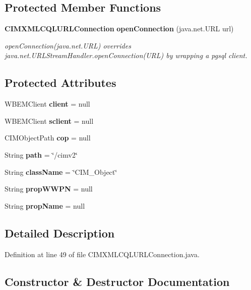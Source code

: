 \subsection*{Protected Member Functions}
\begin{DoxyCompactItemize}
\item 
{\bf C\+I\+M\+X\+M\+L\+C\+Q\+L\+U\+R\+L\+Connection} {\bf open\+Connection} (java.\+net.\+U\+R\+L url)
\begin{DoxyCompactList}\small\item\em open\+Connection(java.\+net.\+U\+R\+L) overrides java.\+net.\+U\+R\+L\+Stream\+Handler.\+open\+Connection(\+U\+R\+L) by wrapping a pgsql client. \end{DoxyCompactList}\end{DoxyCompactItemize}
\subsection*{Protected Attributes}
\begin{DoxyCompactItemize}
\item 
W\+B\+E\+M\+Client {\bf client} = null
\item 
W\+B\+E\+M\+Client {\bf sclient} = null
\item 
C\+I\+M\+Object\+Path {\bf cop} = null
\item 
String {\bf path} = \char`\"{}/cimv2\char`\"{}
\item 
String {\bf class\+Name} = \char`\"{}C\+I\+M\+\_\+\+Object\char`\"{}
\item 
String {\bf prop\+W\+W\+P\+N} = null
\item 
String {\bf prop\+Name} = null
\end{DoxyCompactItemize}


\subsection{Detailed Description}


Definition at line 49 of file C\+I\+M\+X\+M\+L\+C\+Q\+L\+U\+R\+L\+Connection.\+java.



\subsection{Constructor \& Destructor Documentation}
